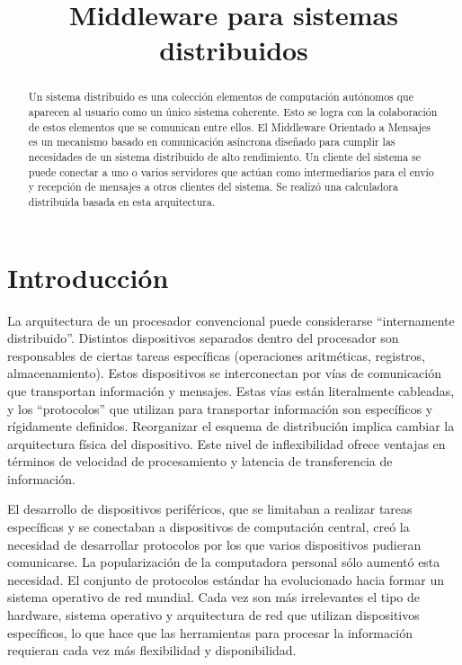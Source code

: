\documentclass[conference,compsoc]{IEEEtran}
\title{Middleware para sistemas distribuidos}
\author{\IEEEauthorblockN{Bruno Campos Uribe}
\IEEEauthorblockA{0223329@up.edu.mx}}
\begin{document}
\maketitle

\begin{abstract}
    Un sistema distribuido es una colección elementos de computación autónomos que aparecen al usuario como un único sistema coherente. Esto se logra con la colaboración de estos elementos que se comunican entre ellos. El Middleware Orientado a Mensajes es un mecanismo basado en comunicación asíncrona diseñado para cumplir las necesidades de un sistema distribuido de alto rendimiento. Un cliente del sistema se puede conectar a uno o varios servidores que actúan como intermediarios para el envío y recepción de mensajes a otros clientes del sistema. Se realizó una calculadora distribuida basada en esta arquitectura.
\end{abstract}

\section{Introducción}

La arquitectura de un procesador convencional puede considerarse ``internamente distribuido''. Distintos dispositivos separados dentro del procesador son responsables de ciertas tareas específicas (operaciones aritméticas, registros, almacenamiento). Estos dispositivos se interconectan por vías de comunicación que transportan información y mensajes. Estas vías están literalmente cableadas, y los ``protocolos'' que utilizan para transportar información son específicos y rígidamente definidos. Reorganizar el esquema de distribución implica cambiar la arquitectura física del dispositivo. Este nivel de inflexibilidad ofrece ventajas en términos de velocidad de procesamiento y latencia de transferencia de información.

El desarrollo de dispositivos periféricos, que se limitaban a realizar tareas específicas y se conectaban a dispositivos de computación central, creó la necesidad de desarrollar protocolos por los que varios dispositivos pudieran comunicarse. La popularización de la computadora personal sólo aumentó esta necesidad. El conjunto de protocolos estándar ha evolucionado hacia formar un sistema operativo de red mundial. Cada vez son más irrelevantes el tipo de hardware, sistema operativo y arquitectura de red que utilizan dispositivos específicos, lo que hace que las herramientas para procesar la información requieran cada vez más flexibilidad y disponibilidad.
\cite{farley_1998}
\end{document}
